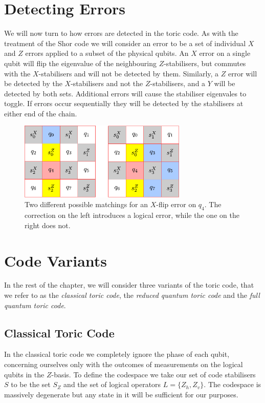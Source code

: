 \section{Detecting Errors}

We will now turn to how errors are detected in the toric code. As with the treatment of the Shor code we will consider an error to be a set of individual $X$ and $Z$ errors applied to a subset of the physical qubits. An $X$ error on a single qubit will flip the eigenvalue of the neighbouring $Z$-stabilisers, but commutes with the $X$-stabilisers and will not be detected by them. Similarly, a $Z$ error will be detected by the $X$-stabilisers and not the $Z$-stabilisers, and a $Y$ will be detected by both sets. Additional errors will cause the stabiliser eigenvales to toggle. If errors occur sequentially they will be detected by the stabilisers at either end of the chain.


\begin{figure}[htb]
  \begin{center}
    \includegraphics[width=8cm]{assets/4-code_error_correct.pdf}
  \end{center}
  \caption{Two different possible matchings for an $X$-flip error on $q_4$. The correction on the left introduces a logical error, while the one on the right does not.}
  \label{4-code_error_correct}
\end{figure}

\section{Code Variants}

In the rest of the chapter, we will consider three variants of the toric code, that we refer to as the \textit{classical toric code}, the \textit{reduced quantum toric code} and the \textit{full quantum toric code}.

\subsection{Classical Toric Code}

In the classical toric code we completely ignore the phase of each qubit, concerning ourselves only with the outcomes of measurements on the logical qubits in the $Z$-basis. To define the codespace we take our set of code stabilisers $S$ to be the set $S_Z$ and the set of logical operators $L=\{Z_h, Z_v\}$. The codespace is massively degenerate but any state in it will be sufficient for our purposes.


